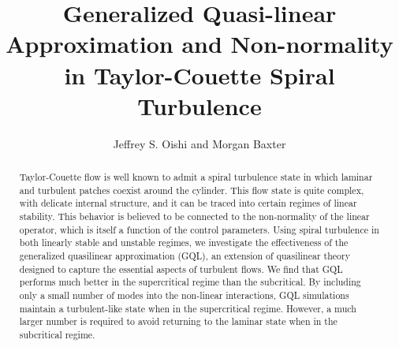 \documentclass[openacc]{rstransa}%
\begin{document}
\title{Generalized Quasi-linear Approximation and Non-normality in Taylor-Couette Spiral Turbulence}

\author{%
Jeffrey S. Oishi and Morgan Baxter}

\address{Department of Physics and Astronomy, Bates College, Lewiston, ME USA}

\subject{xxxxx, xxxxx, xxxx}



\begin{abstract}
Taylor-Couette flow is well known to admit a spiral turbulence state in which laminar and turbulent patches coexist around the cylinder. This flow state is quite complex, with delicate internal structure, and it can be traced into certain regimes of linear stability. This behavior is believed to be connected to the non-normality of the linear operator, which is itself a function of the control parameters. Using spiral turbulence in both linearly stable and unstable regimes, we investigate the effectiveness of the generalized quasilinear approximation (GQL), an extension of quasilinear theory designed to capture the essential aspects of turbulent flows. We find that GQL performs much better in the supercritical regime than the subcritical. By including only a small number of modes into the non-linear interactions, GQL simulations maintain a turbulent-like state when in the supercritical regime. However, a much larger number is required to avoid returning to the laminar state when in the subcritical regime. 
\end{abstract}



\maketitle
\end{document}
